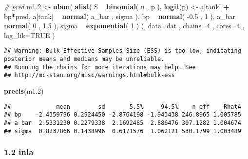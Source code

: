 \documentclass[
]{article}
\newenvironment{Shaded}{\begin{snugshade}}{\end{snugshade}}
\newcommand{\CommentTok}[1]{\textcolor[rgb]{0.56,0.35,0.01}{\textit{#1}}}
\newcommand{\DataTypeTok}[1]{\textcolor[rgb]{0.13,0.29,0.53}{#1}}
\newcommand{\DecValTok}[1]{\textcolor[rgb]{0.00,0.00,0.81}{#1}}
\newcommand{\FloatTok}[1]{\textcolor[rgb]{0.00,0.00,0.81}{#1}}
\newcommand{\KeywordTok}[1]{\textcolor[rgb]{0.13,0.29,0.53}{\textbf{#1}}}
\newcommand{\NormalTok}[1]{#1}
\newcommand{\OperatorTok}[1]{\textcolor[rgb]{0.81,0.36,0.00}{\textbf{#1}}}
\newcommand{\OtherTok}[1]{\textcolor[rgb]{0.56,0.35,0.01}{#1}}
\newcommand{\StringTok}[1]{\textcolor[rgb]{0.31,0.60,0.02}{#1}}
\begin{document}
\begin{Shaded}
\begin{Highlighting}[]
\CommentTok{# pred}
\NormalTok{m1}\FloatTok{.2}\NormalTok{ <-}\StringTok{ }\KeywordTok{ulam}\NormalTok{(}
\KeywordTok{alist}\NormalTok{(}
\NormalTok{S }\OperatorTok{~}\StringTok{ }\KeywordTok{binomial}\NormalTok{( n , p ),}
\KeywordTok{logit}\NormalTok{(p) <-}\StringTok{ }\NormalTok{a[tank] }\OperatorTok{+}\StringTok{ }\NormalTok{bp}\OperatorTok{*}\NormalTok{pred, }
\NormalTok{a[tank] }\OperatorTok{~}\StringTok{ }\KeywordTok{normal}\NormalTok{( a_bar , sigma ), }
\NormalTok{bp }\OperatorTok{~}\StringTok{ }\KeywordTok{normal}\NormalTok{( }\FloatTok{-0.5}\NormalTok{ , }\DecValTok{1}\NormalTok{ ),}
\NormalTok{a_bar }\OperatorTok{~}\StringTok{ }\KeywordTok{normal}\NormalTok{( }\DecValTok{0}\NormalTok{ , }\FloatTok{1.5}\NormalTok{ ),}
\NormalTok{sigma }\OperatorTok{~}\StringTok{ }\KeywordTok{exponential}\NormalTok{( }\DecValTok{1}\NormalTok{ )}
\NormalTok{), }\DataTypeTok{data=}\NormalTok{dat , }\DataTypeTok{chains=}\DecValTok{4}\NormalTok{ , }\DataTypeTok{cores=}\DecValTok{4}\NormalTok{ , }\DataTypeTok{log_lik=}\OtherTok{TRUE}\NormalTok{ ) }
\end{Highlighting}
\end{Shaded}

\begin{verbatim}
## Warning: Bulk Effective Samples Size (ESS) is too low, indicating posterior means and medians may be unreliable.
## Running the chains for more iterations may help. See
## http://mc-stan.org/misc/warnings.html#bulk-ess
\end{verbatim}

\begin{Shaded}
\begin{Highlighting}[]
\KeywordTok{precis}\NormalTok{(m1}\FloatTok{.2}\NormalTok{)}
\end{Highlighting}
\end{Shaded}

\begin{verbatim}
##             mean        sd       5.5%     94.5%    n_eff    Rhat4
## bp    -2.4359796 0.2924450 -2.8764198 -1.943438 246.8965 1.005785
## a_bar  2.5331230 0.2279338  2.1692485  2.886476 307.1282 1.004674
## sigma  0.8237866 0.1438996  0.6171576  1.062121 530.1799 1.003489
\end{verbatim}

\hypertarget{inla-1}{%
\subsubsection{1.2 inla}\label{inla-1}}
\end{document}
